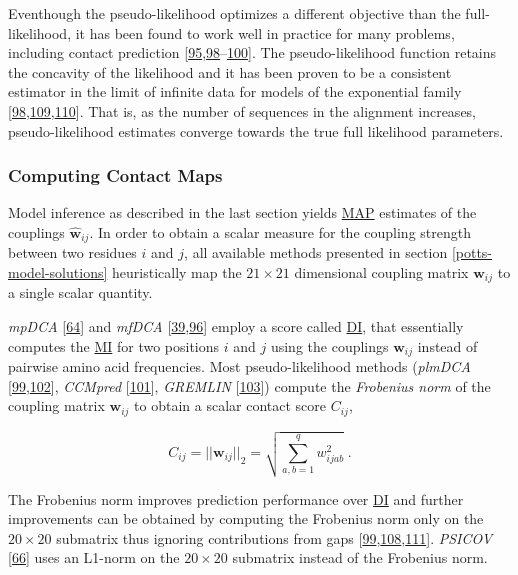 \documentclass[11pt,a4paper,twoside]{book}
\newcommand{\w}{\mathbf{w}}
\newcommand{\wij}{\mathbf{w}_{ij}}
\newcommand{\wijab}{w_{ijab}}
\theoremstyle{definition}
\theoremstyle{definition}
\theoremstyle{remark}
\begin{document}
Eventhough the pseudo-likelihood optimizes a different objective than
the full-likelihood, it has been found to work well in practice for many
problems, including contact prediction
{[}\protect\hyperlink{ref-Murphy2012}{95},\protect\hyperlink{ref-Koller2009}{98}--\protect\hyperlink{ref-Stein2015a}{100}{]}.
The pseudo-likelihood function retains the concavity of the likelihood
and it has been proven to be a consistent estimator in the limit of
infinite data for models of the exponential family
{[}\protect\hyperlink{ref-Koller2009}{98},\protect\hyperlink{ref-Besag1975}{109},\protect\hyperlink{ref-Gidas1988}{110}{]}.
That is, as the number of sequences in the alignment increases,
pseudo-likelihood estimates converge towards the true full likelihood
parameters.

\subsubsection{Computing Contact Maps}\label{post-processing-heuristics}

Model inference as described in the last section yields
\protect\hyperlink{abbrev}{MAP} estimates of the couplings
\(\hat{\w}_{ij}\). In order to obtain a scalar measure for the coupling
strength between two residues \(i\) and \(j\), all available methods
presented in section \ref{potts-model-solutions} heuristically map the
\(21 \! \times \! 21\) dimensional coupling matrix \(\wij\) to a single
scalar quantity.

\emph{mpDCA} {[}\protect\hyperlink{ref-Weigt2009}{64}{]} and
\emph{mfDCA}
{[}\protect\hyperlink{ref-Marks2011}{39},\protect\hyperlink{ref-Morcos2011}{96}{]}
employ a score called \protect\hyperlink{abbrev}{DI}, that essentially
computes the \protect\hyperlink{abbrev}{MI} for two positions \(i\) and
\(j\) using the couplings \(\wij\) instead of pairwise amino acid
frequencies. Most pseudo-likelihood methods (\emph{plmDCA}
{[}\protect\hyperlink{ref-Ekeberg2013}{99},\protect\hyperlink{ref-Ekeberg2014}{102}{]},
\emph{CCMpred} {[}\protect\hyperlink{ref-Seemayer2014}{101}{]},
\emph{GREMLIN} {[}\protect\hyperlink{ref-Kamisetty2013}{103}{]}) compute
the \emph{Frobenius norm} of the coupling matrix \(\wij\) to obtain a
scalar contact score \(C_{ij}\),

\begin{equation}
    C_{ij}  = ||\wij||_2 = \sqrt{\sum_{a,b=1}^q \wijab^2} \; .
\label{eq:frobenius-norm}
\end{equation}

The Frobenius norm improves prediction performance over
\protect\hyperlink{abbrev}{DI} and further improvements can be obtained
by computing the Frobenius norm only on the \(20 \times 20\) submatrix
thus ignoring contributions from gaps
{[}\protect\hyperlink{ref-Ekeberg2013}{99},\protect\hyperlink{ref-Baldassi2014}{108},\protect\hyperlink{ref-Feinauer2014}{111}{]}.
\emph{PSICOV} {[}\protect\hyperlink{ref-Jones2012}{66}{]} uses an
L1-norm on the \(20 \times 20\) submatrix instead of the Frobenius norm.
\end{document}
